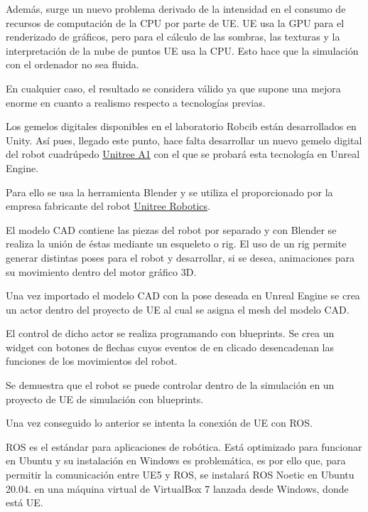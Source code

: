 \documentclass[a4paper, 12pt, spanish, twoside]{article}
\begin{document}
Además, surge un nuevo problema derivado de la intensidad en el consumo de recursos de computación de la CPU por parte de UE. UE usa la GPU para el renderizado de gráficos, pero para el cálculo de las sombras, las texturas y la interpretación de la nube de puntos UE usa la CPU. Esto hace que la simulación con el ordenador no sea fluida. 

En cualquier caso, el resultado se considera válido ya que supone una mejora enorme en cuanto a realismo respecto a tecnologías previas. 


Los gemelos digitales disponibles en el laboratorio Robcib están desarrollados en Unity. Así pues, llegado este punto, hace falta desarrollar un nuevo gemelo digital del robot cuadrúpedo \href{https://www.unitree.com/a1/}{Unitree A1} con el que se probará esta tecnología en Unreal Engine. 

Para ello se usa la herramienta Blender y se utiliza el  proporcionado por la empresa fabricante del robot \href{https://www.unitree.com/}{Unitree Robotics}.  

El modelo CAD contiene las piezas del robot por separado y con Blender se realiza la unión de éstas mediante un esqueleto o rig. El uso de un rig permite generar distintas poses para el robot y desarrollar, si se desea, animaciones para su movimiento dentro del motor gráfico 3D. 

Una vez importado el modelo CAD con la pose deseada en Unreal Engine se crea un actor dentro del proyecto de UE al cual se asigna el mesh del modelo CAD.  

El control de dicho actor se realiza programando con blueprints. Se crea un widget con botones de flechas cuyos eventos de en clicado desencadenan las funciones de los movimientos del robot. 

Se demuestra que el robot se puede controlar dentro de la simulación en un proyecto de UE de simulación con blueprints. 


Una vez conseguido lo anterior se intenta la conexión de UE con ROS.  

ROS es el estándar para aplicaciones de robótica. Está optimizado para funcionar en Ubuntu y su instalación en Windows es problemática, es por ello que, para permitir la comunicación entre UE5 y ROS, se instalará ROS Noetic en Ubuntu 20.04. en una máquina virtual de VirtualBox 7 lanzada desde Windows, donde está UE.  
\end{document}
